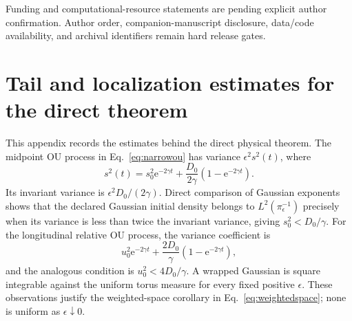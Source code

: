 \documentclass[aps,physrev,reprint,amsmath,amssymb,longbibliography,floatfix]{revtex4-2}
\newcommand{\e}{\mathrm e}
\begin{document}
\begin{acknowledgments}
Funding and computational-resource statements are pending explicit author
confirmation.  Author order, companion-manuscript disclosure, data/code
availability, and archival identifiers remain hard release gates.
\end{acknowledgments}

\appendix

\section{Tail and localization estimates for the direct theorem}
\label{app:directproof}

This appendix records the estimates behind the direct physical theorem.  The
midpoint OU process in Eq.~\eqref{eq:narrowou} has variance
$\epsilon^2s^2(t)$, where
\begin{equation}
 s^2(t)=s_0^2\e^{-2\gamma t}
 +\frac{D_0}{2\gamma}(1-\e^{-2\gamma t}).
\label{eq:midvariance}
\end{equation}
Its invariant variance is $\epsilon^2D_0/(2\gamma)$.  Direct comparison of
Gaussian exponents shows that the declared Gaussian initial density belongs to
$L^2(\pi_\epsilon^{-1})$ precisely when its variance is less than twice the
invariant variance, giving $s_0^2<D_0/\gamma$.  For the longitudinal relative
OU process, the variance coefficient is
\begin{equation}
 u_0^2\e^{-2\gamma t}
 +\frac{2D_0}{\gamma}(1-\e^{-2\gamma t}),
\label{eq:relvariance}
\end{equation}
and the analogous condition is $u_0^2<4D_0/\gamma$.  A wrapped Gaussian is
square integrable against the uniform torus measure for every fixed positive
$\epsilon$.  These observations justify the weighted-space corollary in
Eq.~\eqref{eq:weightedspace}; none is uniform as $\epsilon\downarrow0$.
\end{document}
